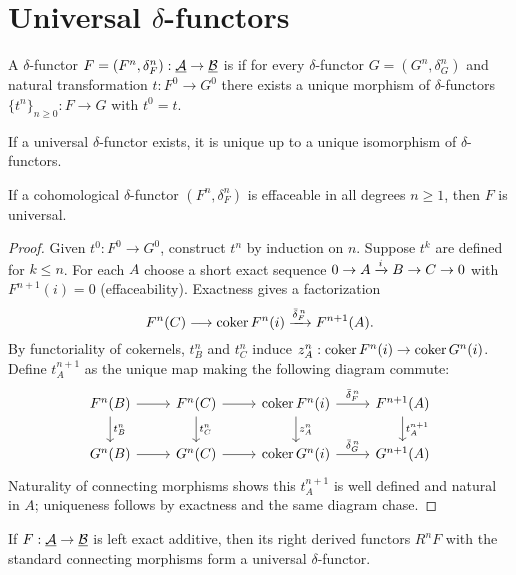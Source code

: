 \section{Universal \texorpdfstring{\( \delta \)}{delta}-functors}

\begin{definition*}
	A \( \delta \)-functor \( F=(F^n,\delta_F^n): \underline{\mathcal{A}} \to \underline{\mathcal{B}} \) is  if for every \( \delta \)-functor \( G=(G^n,\delta_G^n) \) and natural transformation \( t: F^0 \to G^0 \) there exists a unique morphism of \( \delta \)-functors \( \{t^n\}_{n\ge 0}: F \to G \) with \( t^0 = t \).
\end{definition*}

\begin{lemma*}
	If a universal \( \delta \)-functor exists, it is unique up to a unique isomorphism of \( \delta \)-functors.
\end{lemma*}

\begin{theorem*}
	If a cohomological \( \delta \)-functor \( (F^n, \delta_F^n) \) is effaceable in all degrees \( n\ge 1 \), then \( F \) is universal.
\end{theorem*}

\begin{proof}
	Given \( t^0: F^0 \to G^0 \), construct \( t^{n} \) by induction on \( n \). Suppose \( t^k \) are defined for \( k\le n \). For each \( A \) choose a short exact sequence \( 0\to A \xrightarrow{i} B \to C \to 0 \) with \( F^{n+1}(i)=0 \) (effaceability). Exactness gives a factorization
	\[
		F^n(C) \longrightarrow \operatorname{coker} F^n(i) \xrightarrow{\bar\delta_F^{\,n}} F^{n+1}(A).
	\]
	By functoriality of cokernels, \( t^n_B \) and \( t^n_C \) induce \( z_A^{n}: \operatorname{coker} F^n(i) \to \operatorname{coker} G^n(i) \). Define \( t_A^{n+1} \) as the unique map making the following diagram commute:
	\[
		\begin{tikzcd}
			F^n(B) \arrow[r] \arrow[d,"t_B^n"] & F^n(C) \arrow[r] \arrow[d,"t_C^n"] & \coker F^n(i) \arrow[r,"\bar\delta_F^{\,n}"] \arrow[d,"z_A^{n}"] & F^{n+1}(A) \arrow[d,"t_A^{n+1}"] \\
			G^n(B) \arrow[r] & G^n(C) \arrow[r] & \coker G^n(i) \arrow[r,"\bar\delta_G^{\,n}"] & G^{n+1}(A)
		\end{tikzcd}
	\]
	Naturality of connecting morphisms shows this \( t_A^{n+1} \) is well defined and natural in \( A \); uniqueness follows by exactness and the same diagram chase.
\end{proof}

\begin{corollary*}
	If \( F: \underline{\mathcal{A}} \to \underline{\mathcal{B}} \) is left exact additive, then its right derived functors \( R^nF \) with the standard connecting morphisms form a universal \( \delta \)-functor.
\end{corollary*}

